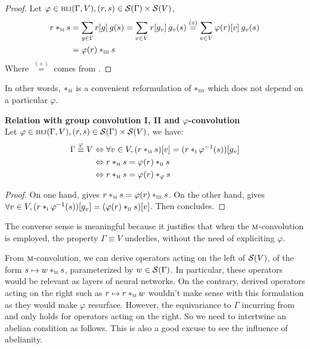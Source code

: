 \begin{proof}
Let $\varphi \in \bij(\Gamma, V),(r,s) \in \cs(\Gamma) \times \cs(V)$,
\begin{align*}
r \ast_{\M} s & = \displaystyle \sum_{g \in \Gamma} r[g] \h{2} g(s)
  = \displaystyle \sum_{v \in V} r[g_v] \h{2} g_v(s)
  \overset{(\diamond)}{=} \displaystyle \sum_{v \in V} \varphi(r)[v] \h{2} g_v(s)\\
& =\varphi(r) \ast_{\III} s
\end{align*}
Where $\overset{(\diamond)}{=}$ comes from .
\end{proof}

In other words, $\ast_{\M}$ is a convenient reformulation of $\ast_{\III}$ which does not depend on a particular $\varphi$.

\begin{lemma}\textbf{Relation with group convolution I, II and $\varphi$-convolution}\\
Let $\varphi \in \bij(\Gamma, V),(r,s) \in \cs(\Gamma) \times \cs(V)$, we have:
\begin{align*}
\Gamma \overset{\varphi}{\equiv} V & \Leftrightarrow \forall v \in V, (r \ast_{\M} s)[v] = (r \ast_{\I} \varphi^{-1}(s))[g_v]\\
& \Leftrightarrow r \ast_{\M} s = \varphi(r) \ast_{\II} s\\
& \Leftrightarrow r \ast_{\M} s = \varphi(r) \ast_{\varphi} s
\end{align*}
\label{lem:rel12m}
\end{lemma}

\begin{proof}
On one hand,  gives $r \ast_{\M} s = \varphi(r) \ast_{\III} s$. On the other hand,  gives $\forall v \in V,
(r \ast_{\I} \varphi^{-1}(s))[g_v] = (\varphi(r) \ast_{\II} s)[v]$. Then  concludes.
\end{proof}

\begin{remark}
The converse sense is meaningful because it justifies that when the $\M$-convolution is employed, the property $\Gamma \equiv V$ underlies, without the need of expliciting $\varphi$.
\end{remark}

From $\M$-convolution, we can derive operators acting on the left of $\cs(V)$, of the form $s \mapsto w \ast_{\M} s$, parameterized by $w \in \cs(\Gamma)$. In particular, these operators would be relevant as layers of neural networks. On the contrary, derived operators acting on the right such as $r \mapsto r \ast_{\M} w$ wouldn't make sense with this formulation as they would make $\varphi$ resurface. However, the equivariance to $\Gamma$ incurring from  and  only holds for operators acting on the right. So we need to intertwine an abelian condition as follows. This is also a good excuse to see the influence of abelianity.


